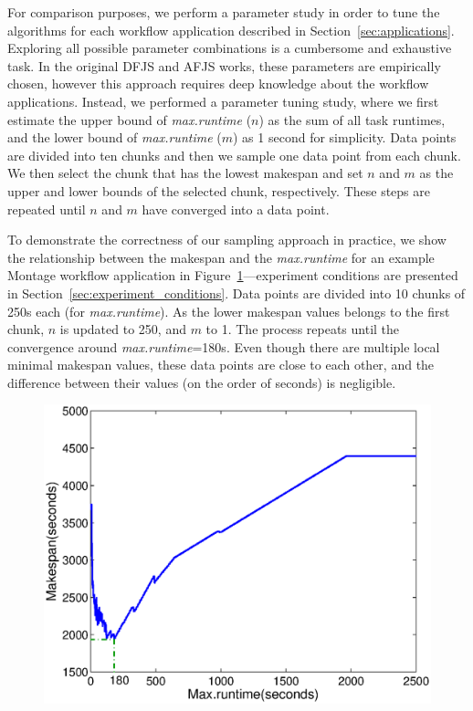 \documentclass[final,5p,times,twocolumn]{elsarticle}
\begin{document}
For comparison purposes, we perform a parameter study in order to tune the algorithms for each workflow application described in Section~\ref{sec:applications}. Exploring all possible parameter combinations is a cumbersome and exhaustive task. In the original DFJS and AFJS works, these parameters are empirically chosen, however this approach requires deep knowledge about the workflow applications. Instead, we performed a parameter tuning study, where we first estimate the upper bound of \emph{max.runtime} ($n$) as the sum of all task runtimes, and the lower bound of \emph{max.runtime} ($m$) as 1 second for simplicity. Data points are divided into ten chunks and then we sample one data point from each chunk. We then select the chunk that has the lowest makespan and set $n$ and $m$ as the upper and lower bounds of the selected chunk, respectively. These steps are repeated until $n$ and $m$ have converged into a data point.


To demonstrate the correctness of our sampling approach in practice, we show the relationship between the makespan and the \emph{max.runtime} for an example Montage workflow application in Figure~\ref{fig:evaluation_dfjs_montage}---experiment conditions are presented in Section~\ref{sec:experiment_conditions}. Data points are divided into 10 chunks of 250s each (for \emph{max.runtime}). As the lower makespan values belongs to the first chunk, $n$ is updated to 250, and $m$ to 1. The process repeats until the convergence around \emph{max.runtime}=180s. Even though there are multiple local minimal makespan values, these data points are close to each other, and the difference between their values (on the order of seconds) is negligible.

\begin{figure}[!htb]
	\centering
	\includegraphics[width=.9\linewidth]{figure19.eps}
	\label{fig:evaluation_dfjs_montage}
\end{figure}
\end{document}
